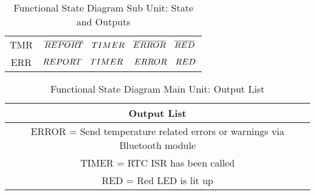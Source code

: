 \begin{center}
\begin{table}[h!]
\begin{tabular}{c|c}
    TMR&$\overline{REPORT}\hbox{  }\hbox{  }\hbox{  }TIMER\hbox{ }\hbox{  }\hbox{  }\overline{ERROR}\hbox{  }\hbox{  }\hbox{  }\overline{RED}$\\
    ERR&$REPORT\hbox{  }\hbox{  }\hbox{  }TIMER\hbox{  }\hbox{ }\hbox{  }\hbox{  }ERROR\hbox{  }\hbox{  }\hbox{  }RED$\\
  \end{tabular}
  \caption{Functional State Diagram Sub Unit: State and Outputs}
  \label{fig:fsd-sub-state-outputs}
\end{table}
\begin{table}[h!]
  \begin{tabular}{|c|}
    \hline
    Output List\\
    \hline
    ERROR = Send temperature related errors or warnings via Bluetooth module\\
    TIMER = RTC ISR has been called\\
    RED = Red LED is lit up\\
    \hline
  \end{tabular}
  \caption{Functional State Diagram Main Unit: Output List}
  \label{fig:fsd-sub-output-list}
\end{table}
\end{center}
